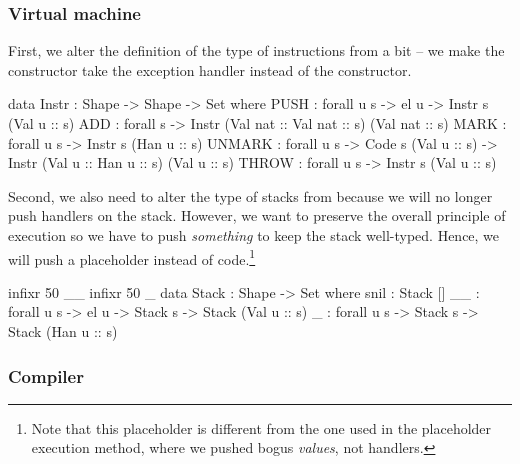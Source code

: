 \subsubsection{Virtual machine}

First, we alter the definition of the type of instructions from
 a bit -- we make the  constructor take
the exception handler instead of the  constructor.

\begin{code}
  data Instr : Shape -> Shape -> Set where
    PUSH : forall {u s} -> el u -> Instr s (Val u :: s)
    ADD : forall {s} -> Instr (Val nat :: Val nat :: s) (Val nat :: s)
    MARK : forall {u s} -> Instr s (Han u :: s)
    UNMARK : forall {u s} -> Code s (Val u :: s) -> Instr (Val u :: Han u :: s) (Val u :: s)
    THROW : forall {u s} -> Instr s (Val u :: s)
\end{code}

Second, we also need to alter the type of stacks from 
because we will no longer push handlers on the stack. However, we want to
preserve the overall principle of execution so we have to push \emph{something}
to keep the stack well-typed.  Hence, we will push a placeholder instead of
code.\footnote{Note that this placeholder is different from the one used in the
placeholder execution method, where we pushed bogus \emph{values}, not
handlers.}

\begin{code}
  infixr 50 _\scons\_
  infixr 50 \void\sconsh\_
  data Stack : Shape -> Set where
    snil : Stack []
    _\scons\_ : forall {u s} -> el u -> Stack s -> Stack (Val u :: s)
    \void\sconsh\_ : forall {u s} -> Stack s -> Stack (Han u :: s)
\end{code}

\subsubsection{Compiler}































































